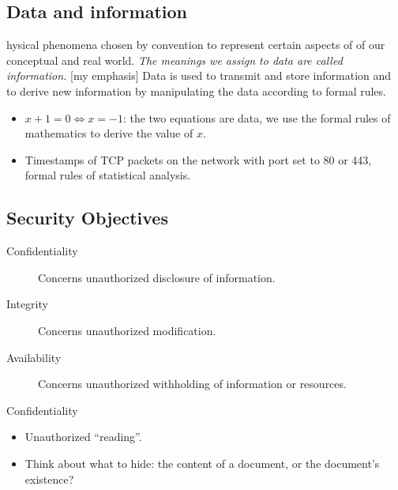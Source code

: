 \subsection{Data and information}

\begin{frame}
  \begin{definition}hysical phenomena chosen by convention to represent certain 
    aspects of of our conceptual and real world.
    \emph{The meanings we assign to data are called information.} [my emphasis]
    Data is used to transmit and store information and to derive new 
    information by manipulating the data according to formal rules.
  \end{definition}
\end{frame}

\begin{frame}
  \begin{example}
    \begin{itemize}
      \item \(x + 1 = 0\iff x = -1\): the two equations are data, we use the 
        formal rules of mathematics to derive the value of \(x\).

      \item Timestamps of TCP packets on the network with port set to 80 or 443, 
        formal rules of statistical analysis.
    \end{itemize}
  \end{example}
\end{frame}

\subsection{Security Objectives}

\begin{frame}
  \begin{description}
    \item[Confidentiality] Concerns unauthorized disclosure of information.
    \item[Integrity] Concerns unauthorized modification.
    \item[Availability] Concerns unauthorized withholding of information or 
      resources.
  \end{description}
\end{frame}

\begin{frame}
  \begin{block}{Confidentiality}
    \begin{itemize}
      \item Unauthorized \enquote{reading}.

      \item Think about what to hide: the content of a document, or the 
        document's existence?
    \end{itemize}
  \end{block}
\end{frame}

